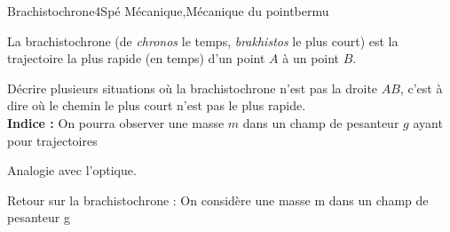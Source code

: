 
\begin{exercise}{Brachistochrone}{4}{Spé}
{Mécanique,Mécanique du point}{bermu}

La brachistochrone (de \emph{chronos} le temps, \emph{brakhistos} le plus court) est la trajectoire la plus rapide (en temps) d’un point $A$ à un point $B$.
\begin{questions}
\question Décrire plusieurs situations où la brachistochrone n’est pas la droite $AB$, c'est à dire où le chemin le plus court n'est pas le plus rapide. \\
\textbf{Indice :} On pourra observer une masse $m$ dans un champ de pesanteur $g$ ayant pour trajectoires
\question Analogie avec l'optique.
\question Retour sur la brachistochrone :
On considère une masse m dans un champ de pesanteur g
\begin{parts}

\end{parts}
\end{questions}
\end{exercise}
